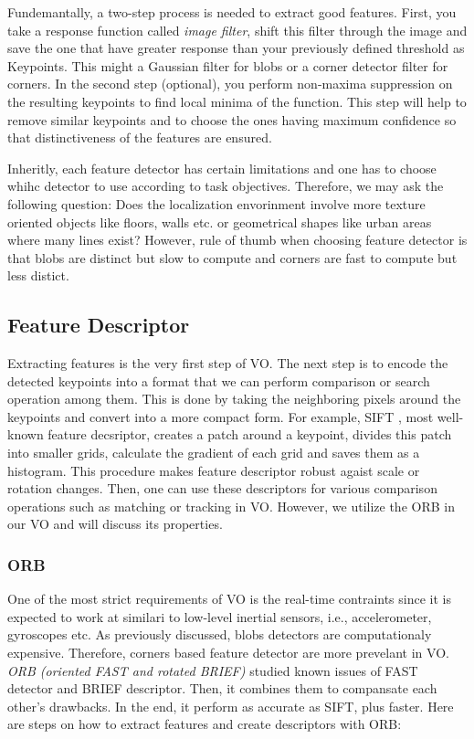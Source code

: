 \documentclass[a4paper]{report}
\numberwithin{figure}{section}
\begin{document}
Fundemantally, a two-step process is needed to extract good features. 
First, you take a response function called \textit{image filter}, 
shift this filter through the image and save the one that have greater 
response than your previously defined threshold as Keypoints. 
This might a Gaussian filter for blobs or a 
corner detector filter for corners. In the second step (optional), 
you perform non-maxima 
suppression on the resulting keypoints to find local minima of the function. 
This step will help to remove similar keypoints and to choose the ones having 
maximum confidence so that distinctiveness of the features are ensured.

Inheritly, each feature detector has certain limitations and one has to 
choose whihc detector to use according to task objectives. Therefore, we may ask 
the following question: 
Does the localization envorinment involve more texture oriented objects like 
floors, walls etc. or geometrical shapes like urban areas where many lines 
exist?
However, rule of thumb when choosing feature detector is that blobs 
are distinct but slow to compute and corners are fast to compute but less 
distict. 

\subsection{Feature Descriptor} \label{sb_sc_feature_descriptor}

Extracting features is the very first step of VO. The next step is to 
encode the detected keypoints into a format that we can perform comparison 
or search operation among them. This is done by taking the neighboring pixels 
around the keypoints and convert into a more compact form. For example, SIFT 
, most well-known feature decsriptor, 
creates a patch around a keypoint, divides this patch into smaller grids,
calculate the gradient of each grid and 
saves them as a histogram.
This procedure makes feature descriptor 
robust agaist scale or rotation changes. Then, one can use these descriptors for 
various comparison operations such as matching or tracking in VO. However, we 
utilize the ORB in our VO and will discuss its properties.


\subsubsection{ORB} \label{sb_sc_orb}

One of the most strict requirements of VO is the real-time contraints since it is 
expected to work at similari to low-level inertial sensors, i.e., accelerometer, gyroscopes etc. 
As previously discussed, blobs detectors are computationaly expensive. Therefore, 
corners based feature detector are more prevelant in VO. 
\textit{ORB (oriented FAST and rotated BRIEF)} studied known issues of 
FAST detector and BRIEF descriptor. Then, it combines them to compansate each 
other's drawbacks. In the end,
it perform as accurate as SIFT, plus faster. Here are steps on how to extract features 
and create descriptors with ORB: 
\end{document}
